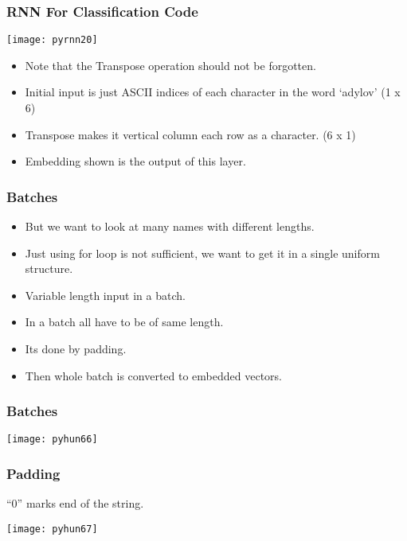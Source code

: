 \begin{frame}[fragile] \frametitle{RNN For Classification Code}
\begin{center}
\texttt{[image: pyrnn20]}
\end{center}
\begin{itemize}
\item Note that the Transpose operation should not be forgotten.
\item Initial input is just ASCII indices of each character in the word `adylov' (1 x 6)
\item Transpose makes it vertical column each row as a character. (6 x 1)
\item Embedding shown is the output of this layer.
\end{itemize}
\end{frame}



\begin{frame}[fragile] \frametitle{Batches}
\begin{itemize}
\item But we want to look at many names with different lengths. 
\item Just using for loop is not sufficient, we want to get it in a single uniform structure.
\item Variable length input in a batch.
\item In a batch all have to be of same length.
\item Its done by padding.
\item Then whole batch is converted to embedded vectors.
\end{itemize}
\end{frame}


\begin{frame}[fragile] \frametitle{Batches}
\begin{center}
\texttt{[image: pyhun66]}
\end{center}
\end{frame}

\begin{frame}[fragile] \frametitle{Padding}
``0'' marks end of the string.

\begin{center}
\texttt{[image: pyhun67]}
\end{center}
\end{frame}

